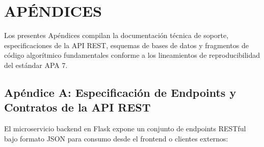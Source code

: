 \section*{APÉNDICES}

Los presentes Apéndices compilan la documentación técnica de soporte, especificaciones de la API REST, esquemas de bases de datos y fragmentos de código algorítmico fundamentales conforme a los lineamientos de reproducibilidad del estándar APA 7.

\subsection*{Apéndice A: Especificación de Endpoints y Contratos de la API REST}

El microservicio backend en Flask expone un conjunto de endpoints RESTful bajo formato JSON para consumo desde el frontend o clientes externos:


